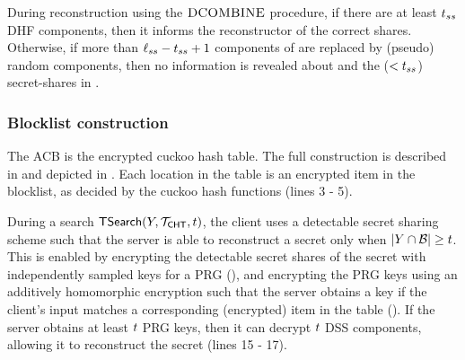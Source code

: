 During reconstruction using the $\textsc{DCOMBINE}$ procedure, if there are at least $t_{ss}$ DHF components, then it informs the reconstructor of the correct shares. Otherwise, if more than $\ell_{ss} - t_{ss} + 1$ components of \ssSet are replaced by (pseudo) random components, then no information is revealed about \genericSymmKey and the ($< t_{ss}$) secret-shares in \ssSet. 

\subsubsection{Blocklist construction}
%
The ACB is the encrypted cuckoo hash table. The full construction is described in  and depicted in . Each location in the table is an encrypted item in the blocklist, as decided by the cuckoo hash functions (lines 3 - 5).

During a search $\mathsf{TSearch}(Y, \mathcal{T}_{\mathsf{CHT}}, t)$, the client uses a detectable secret sharing scheme such that the server is able to reconstruct a secret only when $\setSize{\genericCInputSet \cap \blocklist} \ge \threshold$. This is enabled by encrypting the detectable secret shares of the secret with independently sampled keys for a PRG (), and encrypting the PRG keys using an additively homomorphic encryption such that the server obtains a key if the client's input matches a corresponding (encrypted) item in the table (). If the server obtains at least $t$ PRG keys, then it can decrypt $t$ DSS components, allowing it to reconstruct the secret (lines 15 - 17). 


